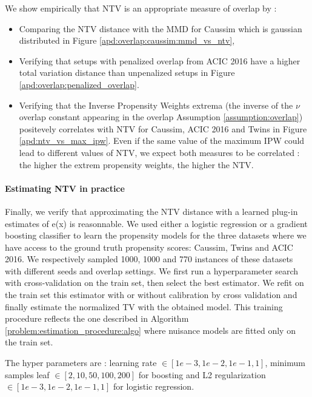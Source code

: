 \documentclass{report}
\begin{document}
\begin{appendices}
  We show empirically that NTV is an appropriate measure of overlap by :
  \begin{itemize}
    \item Comparing the NTV distance with the MMD for Caussim which is gaussian
          distributed in Figure \ref{apd:overlap:caussim:mmd_vs_ntv},
    \item Verifying that setups with penalized overlap from ACIC 2016 have a
          higher total variation distance than unpenalized setups in Figure
          \ref{apd:overlap:penalized_overlap}.
    \item Verifying that the Inverse Propensity Weights extrema (the inverse of
          the $\nu$ overlap constant appearing in the overlap Assumption
          \ref{assumption:overlap}) positevely correlates with NTV for Caussim,
          ACIC 2016 and Twins in Figure \ref{apd:ntv_vs_max_ipw}. Even if the same
          value of the maximum IPW could lead to different values of NTV, we
          expect both measures to be correlated : the higher the extrem propensity
          weights, the higher the NTV.
  \end{itemize}


  \paragraph{Estimating NTV in practice}

  Finally, we verify that approximating the NTV distance with a learned plug-in
  estimates of e(x) is reasonnable. We used either a logistic regression or a
  gradient boosting classifier to learn the propensity models for the three
  datasets where we have access to the ground truth propensity scores: Caussim,
  Twins and ACIC 2016. We respectively sampled 1000, 1000 and 770 instances of
  these datasets with different seeds and overlap settings. We first run a
  hyperparameter search with cross-validation on the train set, then select the
  best estimator. We refit on the train set this estimator with or without
  calibration by cross validation and finally estimate the normalized TV with the
  obtained model. This training procedure reflects the one described in Algorithm
  \ref{problem:estimation_procedure:algo} where nuisance models are fitted only on
  the train set.

  The hyper parameters are : learning rate $ \in [1e-3, 1e-2, 1e-1, 1]$, minimum
  samples leaf $\in [2, 10, 50, 100, 200]$ for boosting and L2 regularization $\in
    [1e-3, 1e-2, 1e-1, 1]$ for logistic regression.


\end{appendices}
\end{document}
